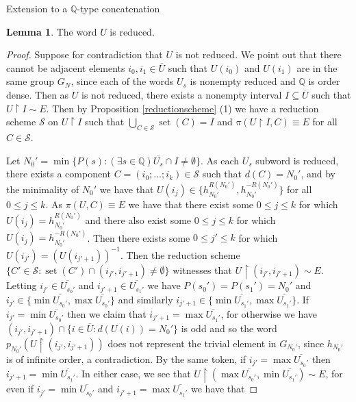 \documentclass{amsart}
\theoremstyle{definition}\newtheorem{theorem}{Theorem}
\theoremstyle{definition}\newtheorem*{A}{Main Theorem}
\theoremstyle{definition}\newtheorem*{B}{Theorem \ref{elementaryequiv}}
\theoremstyle{definition}\newtheorem*{C}{Theorem \ref{continuous}}
\theoremstyle{definition}\newtheorem*{D}{Theorem \ref{bigisomorphism2}}
\theoremstyle{definition}\newtheorem{bigtheorem}{Main Theorem}
\numberwithin{theorem}{section}
\theoremstyle{definition}\newtheorem{corollary}[theorem]{Corollary}
\theoremstyle{definition}\newtheorem{proposition}[theorem]{Proposition}
\theoremstyle{definition}\newtheorem{definition}[theorem]{Definition}
\theoremstyle{definition}\newtheorem{question}[theorem]{Question}
\theoremstyle{definition}\newtheorem{example}[theorem]{Example}
\theoremstyle{definition}\newtheorem{remark}[theorem]{Remark}
\theoremstyle{definition}\newtheorem{note}[theorem]{Note}
\theoremstyle{definition}\newtheorem{lemma}[theorem]{Lemma}
\theoremstyle{definition}\newtheorem{fact}[theorem]{Fact}
\theoremstyle{definition}\newtheorem{define}[theorem]{Definition}
\theoremstyle{definition}\newtheorem{claim}[theorem]{Claim}
\theoremstyle{definition}\newtheorem{obs}[theorem]{Observation}
\theoremstyle{definition}\newtheorem{definitions}[theorem]{Definitions}
\newcommand{\set}{\operatorname{set}}
\begin{document}
\begin{section}{Extension to a $\mathbb{Q}$-type concatenation}
\begin{lemma}\label{Qwordreduced}  The word $U$ is reduced.

\end{lemma}

\begin{proof}  Suppose for contradiction that $U$ is not reduced.  We point out that there cannot be adjacent elements $i_0, i_1 \in \overline{U}$ such that $U(i_0)$ and $U(i_1)$ are in the same group $G_N$, since each of the words $U_s$ is nonempty reduced and $\mathbb{Q}$ is order dense.  Then as $U$ is not reduced, there exists a nonempty interval $I \subseteq \overline{U}$ such that $U \upharpoonright I \sim E$.  Then by Proposition \ref{reductionscheme} (1) we have a reduction scheme $\mathcal{S}$ on $U \upharpoonright I$ such that $\bigcup_{C \in \mathcal{S}} \set(C) = I$ and $\pi(U \upharpoonright I, C) \equiv E$ for all $C \in \mathcal{S}$.

Let $N_0' = \min\{P(s):(\exists s \in \mathbb{Q}) \overline{U_s} \cap I \neq \emptyset\}$.  As each $U_s$ subword is reduced, there exists a component $C = (i_0; \ldots; i_k) \in \mathcal{S}$ such that $d(C) = N_0'$, and by the minimality of $N_0'$ we have that $U(i_j) \in \{h_{N_0'}^{R(N_0')}, h_{N_0'}^{-R(N_0')}\}$ for all $0 \leq j \leq k$.  As $\pi(U, C) \equiv E$ we have that there exist some $0 \leq j \leq k$ for which $U(i_j) = h_{N_0'}^{R(N_0')}$ and there also exist some $0 \leq j \leq k$ for which $U(i_j) = h_{N_0'}^{-R(N_0')}$.  Then there exists some $0 \leq j' \leq k$ for which $U(i_{j'}) = (U(i_{j'+1}))^{-1}$.  Then the reduction scheme $\{C' \in \mathcal{S}: \set(C') \cap (i_{j'}, i_{j'+1}) \neq \emptyset\}$ witnesses that $U \upharpoonright (i_{j'}, i_{j'+1}) \sim E$.  Letting $i_{j'} \in \overline{U_{s_0'}}$ and $i_{j'+1} \in \overline{U_{s_1'}}$ we have $P(s_0') = P(s_1') = N_0'$ and $i_{j'} \in \{\min\overline{U_{s_0'}}, \max\overline{U_{s_0'}}\}$ and similarly $i_{j'+1} \in \{\min\overline{U_{s_1'}}, \max\overline{U_{s_1'}}\}$.  If $i_{j'} = \min\overline{U_{s_0'}}$ then we claim that $i_{j'+1} = \max\overline{U_{s_1'}}$, for otherwise we have $(i_{j'}, i_{j'+1}) \cap \{i \in \overline{U}: d(U(i)) = N_0'\}$ is odd and so the word $p_{N_0'}(U \upharpoonright (i_{j'}, i_{j'+1}))$ does not represent the trivial element in $G_{N_0'}$, since $h_{N_0'}$ is of infinite order, a contradiction.  By the same token, if $i_{j'} = \max\overline{U_{s_0'}}$ then $i_{j'+1} = \min\overline{U_{s_1'}}$.  In either case, we see that $U \upharpoonright (\max\overline{U_{s_0'}}, \min\overline{U_{s_1'}}) \sim E$, for even if $i_{j'} = \min\overline{U_{s_0'}}$ and $i_{j'+1} = \max\overline{U_{s_1'}}$ we have that 



\end{proof}
\end{section}
\end{document}
